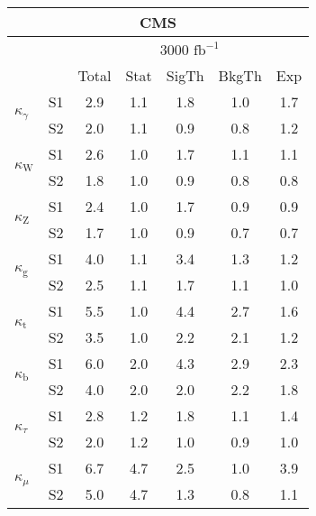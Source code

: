\begin{tabular}{@{} l c c@{\hskip 0.15in} c c c c @{}}
 \hline
   \multicolumn{7}{c}{CMS}\\
 \hline
  &  & \multicolumn{5}{c}{3000 $\text{fb}^{-1}$} \\
  &  & Total & Stat & SigTh & BkgTh & Exp \\
 \hline
\multirow{2}{*}{$\kappa_{\gamma }$} & S1  & 2.9& 1.1 & 1.8 & 1.0 & 1.7  \\[1pt]
                        & S2  & 2.0& 1.1 & 0.9 & 0.8 & 1.2  \\[4pt]
\multirow{2}{*}{$\kappa_{\mathrm{W}}$} & S1  & 2.6& 1.0 & 1.7 & 1.1 & 1.1  \\[1pt]
                        & S2  & 1.8& 1.0 & 0.9 & 0.8 & 0.8  \\[4pt]
\multirow{2}{*}{$\kappa_{\mathrm{Z}}$} & S1  & 2.4& 1.0 & 1.7 & 0.9 & 0.9  \\[1pt]
                        & S2  & 1.7& 1.0 & 0.9 & 0.7 & 0.7  \\[4pt]
\multirow{2}{*}{$\kappa_{\mathrm{g}}$} & S1  & 4.0& 1.1 & 3.4 & 1.3 & 1.2  \\[1pt]
                        & S2  & 2.5& 1.1 & 1.7 & 1.1 & 1.0  \\[4pt]
\multirow{2}{*}{$\kappa_{\mathrm{t}}$} & S1  & 5.5& 1.0 & 4.4 & 2.7 & 1.6  \\[1pt]
                        & S2  & 3.5& 1.0 & 2.2 & 2.1 & 1.2  \\[4pt]
\multirow{2}{*}{$\kappa_{\mathrm{b}}$} & S1  & 6.0& 2.0 & 4.3 & 2.9 & 2.3  \\[1pt]
                        & S2  & 4.0& 2.0 & 2.0 & 2.2 & 1.8  \\[4pt]
\multirow{2}{*}{$\kappa_{\tau }$} & S1  & 2.8& 1.2 & 1.8 & 1.1 & 1.4  \\[1pt]
                        & S2  & 2.0& 1.2 & 1.0 & 0.9 & 1.0  \\[4pt]
\multirow{2}{*}{$\kappa_{\mu}$} & S1  & 6.7& 4.7 & 2.5 & 1.0 & 3.9  \\[1pt]
                        & S2  & 5.0& 4.7 & 1.3 & 0.8 & 1.1  \\[4pt]
\hline
\end{tabular}